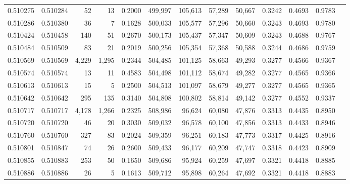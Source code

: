\begin{tabular}{rrrrrrrrrrrrr}
0.510275 & 0.510284 &    52 &    13 &                                     0.2000 & 499,997 & 105,613 &  57,289 &  50,667 & 0.3242 & 0.4693 & 0.9783 \\
0.510286 & 0.510380 &    36 &     7 &                                     0.1628 & 500,033 & 105,577 &  57,296 &  50,660 & 0.3243 & 0.4693 & 0.9780 \\
0.510424 & 0.510458 &   140 &    51 &                                     0.2670 & 500,173 & 105,437 &  57,347 &  50,609 & 0.3243 & 0.4688 & 0.9767 \\
0.510484 & 0.510509 &    83 &    21 &                                     0.2019 & 500,256 & 105,354 &  57,368 &  50,588 & 0.3244 & 0.4686 & 0.9759 \\
0.510569 & 0.510569 & 4,229 & 1,295 &                                     0.2344 & 504,485 & 101,125 &  58,663 &  49,293 & 0.3277 & 0.4566 & 0.9367 \\
0.510574 & 0.510574 &    13 &    11 &                                     0.4583 & 504,498 & 101,112 &  58,674 &  49,282 & 0.3277 & 0.4565 & 0.9366 \\
0.510613 & 0.510613 &    15 &     5 &                                     0.2500 & 504,513 & 101,097 &  58,679 &  49,277 & 0.3277 & 0.4565 & 0.9365 \\
0.510642 & 0.510642 &   295 &   135 &                                     0.3140 & 504,808 & 100,802 &  58,814 &  49,142 & 0.3277 & 0.4552 & 0.9337 \\
0.510717 & 0.510717 & 4,178 & 1,266 &                                     0.2325 & 508,986 &  96,624 &  60,080 &  47,876 & 0.3313 & 0.4435 & 0.8950 \\
0.510720 & 0.510720 &    46 &    20 &                                     0.3030 & 509,032 &  96,578 &  60,100 &  47,856 & 0.3313 & 0.4433 & 0.8946 \\
0.510760 & 0.510760 &   327 &    83 &                                     0.2024 & 509,359 &  96,251 &  60,183 &  47,773 & 0.3317 & 0.4425 & 0.8916 \\
0.510801 & 0.510847 &    74 &    26 &                                     0.2600 & 509,433 &  96,177 &  60,209 &  47,747 & 0.3318 & 0.4423 & 0.8909 \\
0.510855 & 0.510883 &   253 &    50 &                                     0.1650 & 509,686 &  95,924 &  60,259 &  47,697 & 0.3321 & 0.4418 & 0.8885 \\
0.510886 & 0.510886 &    26 &     5 &                                     0.1613 & 509,712 &  95,898 &  60,264 &  47,692 & 0.3321 & 0.4418 & 0.8883 \\

\end{tabular}
